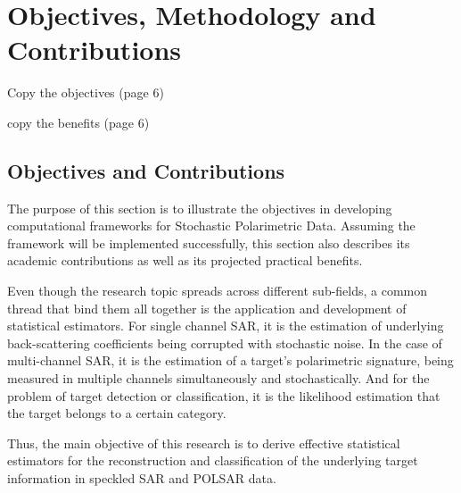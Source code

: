 	\section{Objectives, Methodology and Contributions}

Copy the objectives (page 6)

copy the benefits (page 6)
        
\subsection{Objectives and Contributions}

The purpose of this section is to illustrate the objectives in developing computational frameworks for Stochastic Polarimetric Data. 
Assuming the framework will be implemented successfully, this section also describes its academic contributions as well as its projected practical benefits.

Even though the research topic spreads across different sub-fields, a common thread that bind them all together is the application and development of statistical estimators.
For single channel SAR, it is the estimation of underlying back-scattering coefficients being corrupted with stochastic noise.
In the case of multi-channel SAR, it is the estimation of a target's polarimetric signature, being measured in multiple channels simultaneously and stochastically.
And for the problem of target detection or classification, it is the likelihood estimation that the target belongs to a certain category.

Thus, the main objective of this research is to derive effective statistical estimators for the reconstruction and classification of the underlying target information in speckled SAR and POLSAR data.

